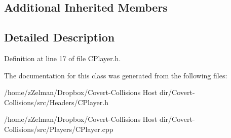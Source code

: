 \subsection*{Additional Inherited Members}


\subsection{Detailed Description}


Definition at line 17 of file C\-Player.\-h.



The documentation for this class was generated from the following files\-:\begin{DoxyCompactItemize}
\item 
/home/z\-Zelman/\-Dropbox/\-Covert-\/\-Collisions Host dir/\-Covert-\/\-Collisions/src/\-Headers/C\-Player.\-h\item 
/home/z\-Zelman/\-Dropbox/\-Covert-\/\-Collisions Host dir/\-Covert-\/\-Collisions/src/\-Players/C\-Player.\-cpp\end{DoxyCompactItemize}
